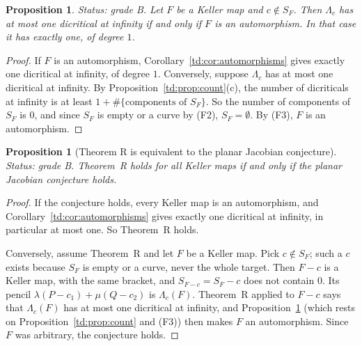 \documentclass[a4paper,11pt]{article}
\theoremstyle{jsplain}
\newtheorem{proposition}[theorem]{Proposition}
\theoremstyle{jsdef}
\theoremstyle{jsrem}
\begin{document}
\begin{proposition}\label{td:prop:onedic}
\textit{Status: grade B.}
Let $F$ be a Keller map and $c \notin S_F$. Then $\Lambda_c$ has at most one dicritical at
infinity if and only if $F$ is an automorphism. In that case it has exactly one, of degree $1$.
\end{proposition}

\begin{proof}
If $F$ is an automorphism, Corollary~\ref{td:cor:automorphisms} gives exactly one dicritical at
infinity, of degree $1$. Conversely, suppose $\Lambda_c$ has at most one dicritical at infinity.
By Proposition~\ref{td:prop:count}(c), the number of dicriticals at infinity is at least
$1 + \#\{\text{components of } S_F\}$. So the number of components of $S_F$ is $0$, and since
$S_F$ is empty or a curve by (F2), $S_F = \emptyset$. By (F3), $F$ is an automorphism.
\end{proof}

\begin{proposition}[Theorem R is equivalent to the planar Jacobian conjecture]\label{td:prop:equiv}
\textit{Status: grade B.}
Theorem~R holds for all Keller maps if and only if the planar Jacobian conjecture holds.
\end{proposition}

\begin{proof}
If the conjecture holds, every Keller map is an automorphism, and
Corollary~\ref{td:cor:automorphisms} gives exactly one dicritical at infinity, in particular at
most one. So Theorem~R holds.

Conversely, assume Theorem~R and let $F$ be a Keller map. Pick $c \notin S_F$; such a $c$ exists
because $S_F$ is empty or a curve, never the whole target. Then $F - c$ is a Keller map, with the
same bracket, and $S_{F-c} = S_F - c$ does not contain $0$. Its pencil
$\lambda (P - c_1) + \mu (Q - c_2)$ is $\Lambda_c(F)$. Theorem~R applied to $F - c$ says that
$\Lambda_c(F)$ has at most one dicritical at infinity, and Proposition~\ref{td:prop:onedic}
(which rests on Proposition~\ref{td:prop:count} and (F3)) then makes $F$ an automorphism. Since
$F$ was arbitrary, the conjecture holds.
\end{proof}
\end{document}
